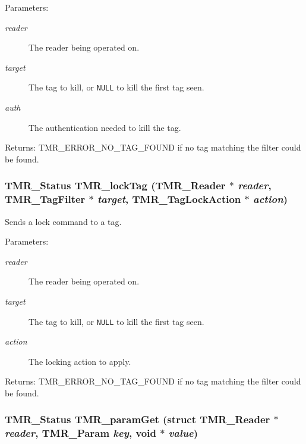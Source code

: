 \begin{Desc}
\item[Parameters:]
\begin{description}
\item[{\em reader}]The reader being operated on. \item[{\em target}]The tag to kill, or {\tt NULL} to kill the first tag seen. \item[{\em auth}]The authentication needed to kill the tag.\end{description}
\end{Desc}
\begin{Desc}
\item[Returns:]TMR\_\-ERROR\_\-NO\_\-TAG\_\-FOUND if no tag matching the filter could be found. \end{Desc}
\hypertarget{group__reader_g8597458eb25df64f934016a89eac981c}{
\subsubsection[{TMR\_\-lockTag}]{\setlength{\rightskip}{0pt plus 5cm}TMR\_\-Status TMR\_\-lockTag ({\bf TMR\_\-Reader} $\ast$ {\em reader}, \/  {\bf TMR\_\-TagFilter} $\ast$ {\em target}, \/  {\bf TMR\_\-TagLockAction} $\ast$ {\em action})}}
\label{group__reader_g8597458eb25df64f934016a89eac981c}


Sends a lock command to a tag.

\begin{Desc}
\item[Parameters:]
\begin{description}
\item[{\em reader}]The reader being operated on. \item[{\em target}]The tag to kill, or {\tt NULL} to kill the first tag seen. \item[{\em action}]The locking action to apply.\end{description}
\end{Desc}
\begin{Desc}
\item[Returns:]TMR\_\-ERROR\_\-NO\_\-TAG\_\-FOUND if no tag matching the filter could be found. \end{Desc}
\hypertarget{group__reader_g799e9d2c2d6b254e689bc53570af8f15}{
\subsubsection[{TMR\_\-paramGet}]{\setlength{\rightskip}{0pt plus 5cm}TMR\_\-Status TMR\_\-paramGet (struct {\bf TMR\_\-Reader} $\ast$ {\em reader}, \/  {\bf TMR\_\-Param} {\em key}, \/  void $\ast$ {\em value})}}
\label{group__reader_g799e9d2c2d6b254e689bc53570af8f15}


